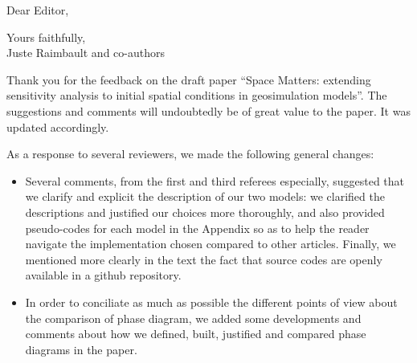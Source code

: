 \documentclass[11pt,a4paper,sans]{moderncv}        %
\begin{document}
\date{\today}
\opening{Dear Editor,}
\closing{Yours faithfully,\\
Juste Raimbault and co-authors%
}

\makelettertitle



\justify


Thank you for the feedback on the draft paper ``Space Matters: extending sensitivity analysis to initial spatial conditions in geosimulation models''. The suggestions and comments will undoubtedly be of great value to the paper. It was updated accordingly.

\medskip







As a response to several reviewers, we made the following general changes:

\begin{itemize}
	\item Several comments, from the first and third referees especially, suggested that we clarify and explicit the description of our two models: we clarified the descriptions and justified our choices more thoroughly, and also provided pseudo-codes for each model in the Appendix so as to help the reader navigate the implementation chosen compared to other articles. Finally, we mentioned more clearly in the text the fact that source codes are openly available in a github repository.
    \item In order to conciliate as much as possible the different points of view about the comparison of phase diagram, we added some developments and comments about how we defined, built, justified and compared phase diagrams in the paper.
    \end{itemize}
\end{document}
